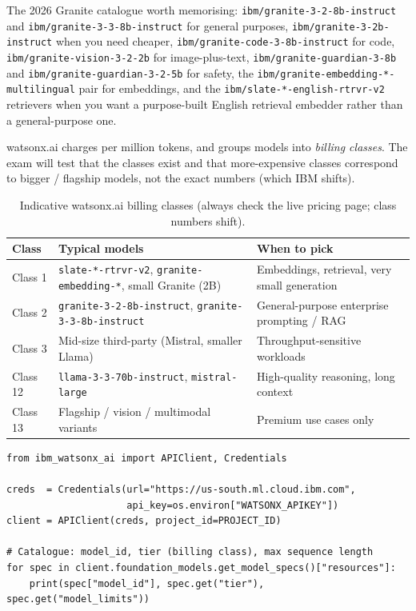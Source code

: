 The 2026 Granite catalogue worth memorising: \texttt{ibm/granite-3-2-8b-instruct} and \texttt{ibm/granite-3-3-8b-instruct} for general purposes, \texttt{ibm/granite-3-2b-instruct} when you need cheaper, \texttt{ibm/granite-code-3-8b-instruct} for code, \texttt{ibm/granite-vision-3-2-2b} for image-plus-text, \texttt{ibm/granite-guardian-3-8b} and \texttt{ibm/granite-guardian-3-2-5b} for safety, the \texttt{ibm/granite-embedding-*-multilingual} pair for embeddings, and the \texttt{ibm/slate-*-english-rtrvr-v2} retrievers when you want a purpose-built English retrieval embedder rather than a general-purpose one.

watsonx.ai charges per million tokens, and groups models into \emph{billing classes}. The exam will test that the classes exist and that more-expensive classes correspond to bigger / flagship models, not the exact numbers (which IBM shifts).

\begin{table}[h]
\centering
\small
\begin{tabularx}{\textwidth}{l X X}
\toprule
\textbf{Class} & \textbf{Typical models} & \textbf{When to pick} \\
\midrule
Class 1  & \texttt{slate-*-rtrvr-v2}, \texttt{granite-embedding-*}, small Granite (2B) & Embeddings, retrieval, very small generation \\
Class 2  & \texttt{granite-3-2-8b-instruct}, \texttt{granite-3-3-8b-instruct} & General-purpose enterprise prompting / RAG \\
Class 3  & Mid-size third-party (Mistral, smaller Llama) & Throughput-sensitive workloads \\
Class 12 & \texttt{llama-3-3-70b-instruct}, \texttt{mistral-large} & High-quality reasoning, long context \\
Class 13 & Flagship / vision / multimodal variants & Premium use cases only \\
\bottomrule
\end{tabularx}
\caption{Indicative watsonx.ai billing classes (always check the live pricing page; class numbers shift).}
\label{tab:billing-classes}
\end{table}


\begin{examplebox}[title=\textbf{Listing what's actually available}]
\begin{lstlisting}[style=pythonstyle]
from ibm_watsonx_ai import APIClient, Credentials

creds  = Credentials(url="https://us-south.ml.cloud.ibm.com",
                     api_key=os.environ["WATSONX_APIKEY"])
client = APIClient(creds, project_id=PROJECT_ID)

# Catalogue: model_id, tier (billing class), max sequence length
for spec in client.foundation_models.get_model_specs()["resources"]:
    print(spec["model_id"], spec.get("tier"), spec.get("model_limits"))
\end{lstlisting}
\end{examplebox}


